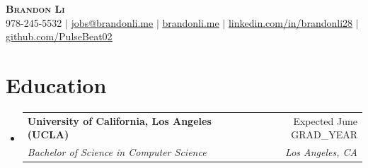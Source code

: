 \documentclass[letterpaper,11pt]{article}
\makeatletter
\let\oldhref\href
\renewcommand{\href}[2]{\oldhref{#1}{\uline{#2}}}
\newcommand{\resumeSubheading}[4]{
    \vspace{-2pt}\item
    \begin{tabular*}{0.97\textwidth}[t]{l@{\extracolsep{\fill}}r}
    \textbf{#1} & #2 \\
    \textit{\small#3} & \textit{\small #4} \\
    \end{tabular*}\vspace{-7pt}
}
\newcommand{\resumeSubHeadingListStart}{\begin{itemize}[leftmargin=0.15in, label={}]}
\newcommand{\resumeSubHeadingListEnd}{\end{itemize}}
\makeatother
\begin{document}

    \begin{center}
        \textbf{\Huge \scshape Brandon Li} \\ \vspace{1pt}
        \small 978-245-5532 $|$
        \href{mailto:jobs@brandonli.me}{jobs@brandonli.me} $|$
        \href{https://brandonli.me}{brandonli.me} $|$
        \href{https://linkedin.com/in/brandonli28}{linkedin.com/in/brandonli28} $|$
        \href{https://github.com/PulseBeat02}{github.com/PulseBeat02}
    \end{center}


    \section{Education}
    \resumeSubHeadingListStart
    \resumeSubheading
    {University of California, Los Angeles (UCLA)}{Expected June {{GRAD_YEAR}}}
    {Bachelor of Science in Computer Science}{Los Angeles, CA}
    \resumeSubHeadingListEnd


\end{document}
